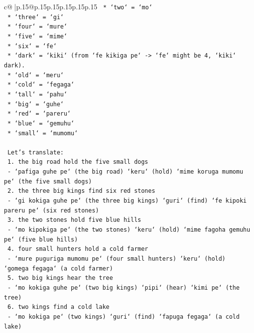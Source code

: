 \documentclass{article}
\begin{document}
{\begin{supertabular}{c@{$\;$}|p{.15\linewidth}@{}p{.15\linewidth}p{.15\linewidth}p{.15\linewidth}p{.15\linewidth}p{.15\linewidth}}
{{{\texttt{    *   `two` = `mo`} \\
\texttt{    *   `three` = `gi`} \\
\texttt{    *   `four` = `mure`} \\
\texttt{    *   `five` = `mime`} \\
\texttt{    *   `six` = `fe`} \\
\texttt{    *   `dark` = `kiki` (from `fe kikiga pe` {-}> `fe` might be 4, `kiki` dark).} \\
\texttt{    *   `old` = `meru`} \\
\texttt{    *   `cold` = `fegaga`} \\
\texttt{    *   `tall` = `pahu`} \\
\texttt{    *   `big` = `guhe`} \\
\texttt{    *   `red` = `pareru`} \\
\texttt{    *   `blue` = `gemuhu`} \\
\texttt{    *   `small` = `mumomu`} \\
\\ 
\texttt{    Let's translate:} \\
\texttt{    1. the big road hold the five small dogs} \\
\texttt{       {-} `pafiga guhe pe` (the big road) `keru` (hold) `mime koruga mumomu pe` (the five small dogs)} \\
\texttt{    2. the three big kings find six red stones} \\
\texttt{       {-} `gi kokiga guhe pe` (the three big kings) `guri` (find) `fe kipoki pareru pe` (six red stones)} \\
\texttt{    3. the two stones hold five blue hills} \\
\texttt{       {-} `mo kipokiga pe` (the two stones) `keru` (hold) `mime fagoha gemuhu pe` (five blue hills)} \\
\texttt{    4. four small hunters hold a cold farmer} \\
\texttt{       {-} `mure puguriga mumomu pe` (four small hunters) `keru` (hold) `gomega fegaga` (a cold farmer)} \\
\texttt{    5. two big kings hear the tree} \\
\texttt{       {-} `mo kokiga guhe pe` (two big kings) `pipi` (hear) `kimi pe` (the tree)} \\
\texttt{    6. two kings find a cold lake} \\
\texttt{       {-} `mo kokiga pe` (two kings) `guri` (find) `fapuga fegaga` (a cold lake)} \\
}}}
\end{supertabular}}
\end{document}
